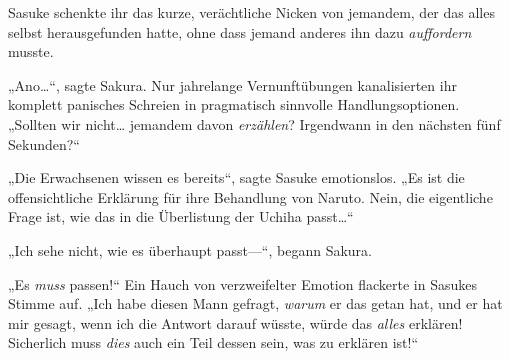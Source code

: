 Sasuke schenkte ihr das kurze, verächtliche Nicken von jemandem, der das alles selbst herausgefunden hatte, ohne dass jemand anderes ihn dazu \emph{auffordern} musste.

„Ano…“, sagte Sakura. Nur jahrelange Vernunftübungen kanalisierten ihr komplett panisches Schreien in pragmatisch sinnvolle Handlungsoptionen. „Sollten wir nicht… jemandem davon \emph{erzählen}? Irgendwann in den nächsten fünf Sekunden?“

„Die Erwachsenen wissen es bereits“, sagte Sasuke emotionslos. „Es ist die offensichtliche Erklärung für ihre Behandlung von Naruto. Nein, die eigentliche Frage ist, wie das in die Überlistung der Uchiha passt…“

„Ich sehe nicht, wie es überhaupt passt—“, begann Sakura.

„Es \emph{muss} passen!“ Ein Hauch von verzweifelter Emotion flackerte in Sasukes Stimme auf. „Ich habe diesen Mann gefragt, \emph{warum} er das getan hat, und er hat mir gesagt, wenn ich die Antwort darauf wüsste, würde das \emph{alles} erklären! Sicherlich muss \emph{dies} auch ein Teil dessen sein, was zu erklären ist!“

